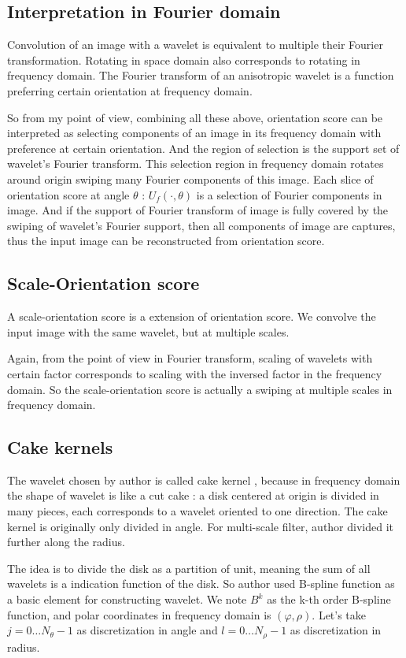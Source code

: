 \documentclass{article}
\begin{document}
	\subsection{Interpretation in Fourier domain}
	Convolution of an image with a wavelet is equivalent to multiple their Fourier transformation. Rotating in space domain also corresponds to rotating in frequency domain. The Fourier transform of an anisotropic wavelet is a function preferring certain orientation at frequency domain.
	
	So from my point of view, combining all these above, orientation score can be interpreted as selecting components of an image in its frequency domain with preference at certain orientation. And the region of selection is the support set of wavelet's Fourier transform. This selection region in frequency domain rotates around origin swiping many Fourier components of this image. Each slice of orientation score at angle $\theta$ : $U_f(\cdot,\theta)$ is a selection of Fourier components in image. And if the support of Fourier transform of image is fully covered by the swiping of wavelet's Fourier support, then all components of image are captures, thus the input image can be reconstructed from orientation score.
	
	\subsection{Scale-Orientation score}
	A scale-orientation score is a extension of orientation score. We convolve the input image with the same wavelet, but at multiple scales.
	
	Again, from the point of view in Fourier transform, scaling of wavelets with certain factor corresponds to scaling with the inversed factor in the frequency domain. So the scale-orientation score is actually a swiping at multiple scales in frequency domain.
	
	\subsection{Cake kernels}
	The wavelet chosen by author is called cake kernel \cite{franken2008enhancement}, because in frequency domain the shape of wavelet is like a cut cake : a disk centered at origin is divided in many pieces, each corresponds to a wavelet oriented to one direction. The cake kernel is originally only divided in angle. For multi-scale filter, author divided it further along the radius.
	
	The idea is to divide the disk as a partition of unit, meaning the sum of all wavelets is a indication function of the disk. So author used B-spline function as a basic element for constructing wavelet. We note $B^k$ as the k-th order B-spline function, and polar coordinates in frequency domain is $(\varphi,\rho)$. Let's take $j=0\dots N_\theta-1$ as discretization in angle and $l=0\dots N_\rho-1$ as discretization in radius.
	
\end{document}
